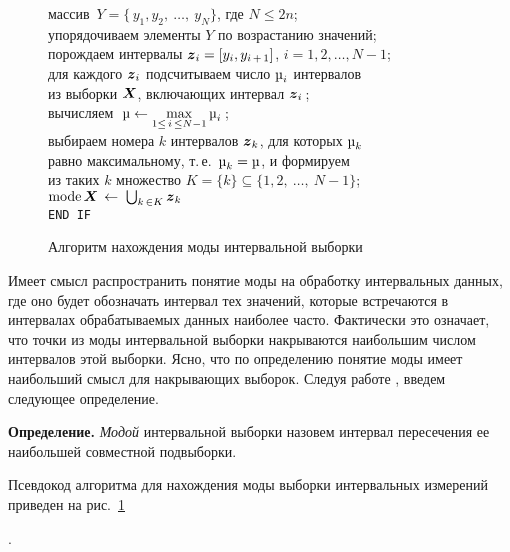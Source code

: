 \documentclass[a5paper,openany]{book}
\newcommand{\mbf}[1]{\protect\text{\boldmath$#1$}}
\newcommand{\mode}{\mathrm{mode}\,}
\renewcommand{\mu}{\text{\textmu}}
\begin{document}
{\begin{figure}[!hp]
{{\begin{minipage}{100mm}
\begin{tabbing}
					\>\> \quad массив $\,Y = \{\,y_{1}, y_{2}, \ \ldots, \ y_{N}\}$,  
					где $N\leq 2n$;   \\[1mm] 
					\>\> упорядочиваем элементы $Y$ по возрастанию значений;                  \\[1mm]
					\>\> порождаем интервалы $\mbf{z}_{i} = [y_{i}, y_{i \, + \, 1}]$, 
					$i = 1,2,\ldots,N-1$; ~~~~~~~  \\[1mm] 
					\>\> для каждого $\mbf{z}_{i}$ подсчитываем число $\mu_i$ интервалов      \\[2pt] 
					\>\>\quad из выборки $\mbf{X}$, включающих интервал $\mbf{z}_{i}\,$;      \\[2mm] 
					\>\> вычисляем $\displaystyle\;\mu\gets \max_{1  \leq \, i \, \leq N-1}\mu_{i}\,$; \\[1mm]   
					\>\> выбираем номера $k$ интервалов $\mbf{z}_k$, для которых $\mu_k$      \\[2pt] 
					\>\> \quad равно максимальному, т.\,е. $\,\mu_{k} = \mu$, и формируем     \\[2pt]
					\>\> \quad из таких $k$ 
					множество $K = \{k\}\subseteq\{ 1,2, \ \ldots, \ N-1\}$;     \\[2mm] 
					\>\> $\mode\mbf{X}\, \gets \;\bigcup_{k \, \in K} \mbf{z}_{k}$                \\[3mm] 
					\> \texttt{END IF}
				\end{tabbing} 
			\end{minipage}
		}
\begin{center}
		\caption{Алгоритм нахождения моды 	интервальной выборки} 
		\label{ModeAlgo} 
\end{center} 
	} %
\end{figure}

Имеет смысл  распространить понятие моды на обработку интервальных данных, где оно 
будет обозначать интервал тех значений, которые встречаются 
в интервалах обрабатываемых данных наиболее часто. Фактически это означает, что 
точки из моды интервальной выборки накрываются наибольшим числом интервалов этой 
выборки. 
Ясно, что по  определению понятие моды имеет  наибольший смысл для накрывающих выборок. 
Следуя работе \cite{HuCHuZH}, введем следующее определение.

{\bf Определение.}
	\textsl{Модой} интервальной выборки назовем интервал пересечения ее наибольшей 
	совместной подвыборки.   

Псевдокод алгоритма для нахождения моды выборки интервальных измерений приведен 
на рис.~\ref{ModeAlgo}}.
\end{document}
